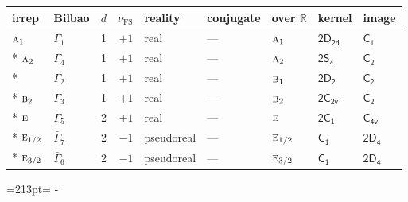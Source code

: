 \documentclass[10pt,a4paper]{article}
\makeatletter
\def\grouprule#1#2{\noalign{\marks\LTgroupmarks{\the\belowrulesep}\nobreak\vskip#1%
  \vskip\aboverulesep}\multispan\LT@cols\unskip{\leaders\hrule\@height#2\hfill\kern\z@}\cr
  \noalign{\penalty\LTrulebreak\vskip\belowrulesep\global\@lastruleclass\z@}}
\newcommand{\needspace}[1]{\par\penalty-100\begingroup\dimen0=#1\relax\dimen2=\pagegoal
  \advance\dimen2-\pagetotal\ifdim\dimen0>\dimen2\relax\ifdim\dimen2>0pt\vfil\break\fi\fi
  \endgroup}
\numberwithin{equation}{section}
\newcommand{\grp}[1]{\mathsf{#1}}
\newcommand{\irr}[1]{\text{\normalfont\scshape #1}}
\newcommand{\detbox}[1]{{\setlength{\fboxsep}{1pt}\fbox{#1}}}
\newcommand{\fsind}{\nu_{\mathrm{FS}}}
\makeatother
\begin{document}
\setlength{\emergencystretch}{2em}\par\setlength{\emergencystretch}{0pt}
{\small\renewcommand{\arraystretch}{1.25}\setlength{\tabcolsep}{4pt}\begin{longtable}{@{}llrrlllll@{}}\toprule
irrep & Bilbao & $d$ & $\fsind$ & reality & conjugate & over $\mathbb{R}$ & kernel & image\\\midrule\endhead
\bottomrule\endfoot\endlastfoot
$\irr{a}_{1}$ & $\Gamma_{1}$ & 1 & $+1$ & real & --- & $\irr{a}_{1}$ & \href{2D2d.pdf}{$\grp{2D_{2d}}$} & \href{../../../rotation/data/pdf/C1.pdf}{$\grp{C_{1}}$}\\*
$\irr{a}_{2}$ & $\Gamma_{4}$ & 1 & $+1$ & real & --- & $\irr{a}_{2}$ & \href{2S4.pdf}{$\grp{2S_{4}}$} & \href{../../../rotation/data/pdf/C2.pdf}{$\grp{C_{2}}$}\\*
\detbox{$\irr{b}_{1}$} & $\Gamma_{2}$ & 1 & $+1$ & real & --- & $\irr{b}_{1}$ & \href{2D2.pdf}{$\grp{2D_{2}}$} & \href{../../../rotation/data/pdf/C2.pdf}{$\grp{C_{2}}$}\\*
$\irr{b}_{2}$ & $\Gamma_{3}$ & 1 & $+1$ & real & --- & $\irr{b}_{2}$ & \href{2C2v.pdf}{$\grp{2C_{2v}}$} & \href{../../../rotation/data/pdf/C2.pdf}{$\grp{C_{2}}$}\\*
$\irr{e}$ & $\Gamma_{5}$ & 2 & $+1$ & real & --- & $\irr{e}$ & \href{2C1.pdf}{$\grp{2C_{1}}$} & \href{../../../rotation/data/pdf/C4v.pdf}{$\grp{C_{4v}}$}\\*
\grouprule{0pt}{\lightrulewidth}
$\irr{e}_{1/2}$ & $\bar{\Gamma}_{7}$ & 2 & $-1$ & pseudoreal & --- & $\irr{e}_{1/2}$ & \href{C1.pdf}{$\grp{C_{1}}$} & \href{2D4.pdf}{$\grp{2D_{4}}$}\\*
$\irr{e}_{3/2}$ & $\bar{\Gamma}_{6}$ & 2 & $-1$ & pseudoreal & --- & $\irr{e}_{3/2}$ & \href{C1.pdf}{$\grp{C_{1}}$} & \href{2D4.pdf}{$\grp{2D_{4}}$}\\
\bottomrule\end{longtable}}
\needspace{213pt}
\end{document}
